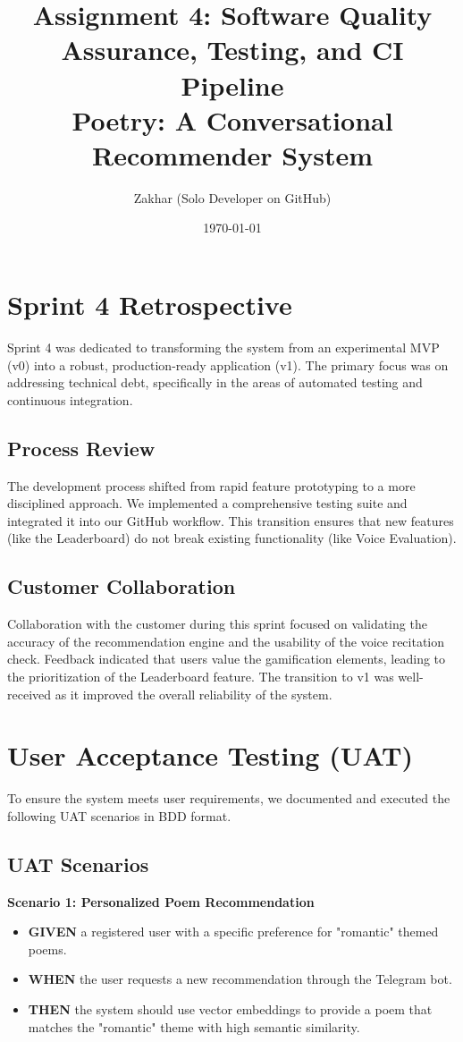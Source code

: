 \documentclass[12pt,a4paper]{article}
\title{Assignment 4: Software Quality Assurance, Testing, and CI Pipeline \\ \large Poetry: A Conversational Recommender System}
\author{Zakhar (Solo Developer on GitHub)}
\date{\today}
\begin{document}
\maketitle

\tableofcontents
\newpage

\section{Sprint 4 Retrospective}
Sprint 4 was dedicated to transforming the system from an experimental MVP (v0) into a robust, production-ready application (v1). The primary focus was on addressing technical debt, specifically in the areas of automated testing and continuous integration.

\subsection{Process Review}
The development process shifted from rapid feature prototyping to a more disciplined approach. We implemented a comprehensive testing suite and integrated it into our GitHub workflow. This transition ensures that new features (like the Leaderboard) do not break existing functionality (like Voice Evaluation).

\subsection{Customer Collaboration}
Collaboration with the customer during this sprint focused on validating the accuracy of the recommendation engine and the usability of the voice recitation check. Feedback indicated that users value the gamification elements, leading to the prioritization of the Leaderboard feature. The transition to v1 was well-received as it improved the overall reliability of the system.

\section{User Acceptance Testing (UAT)}
To ensure the system meets user requirements, we documented and executed the following UAT scenarios in BDD format.

\subsection{UAT Scenarios}

\textbf{Scenario 1: Personalized Poem Recommendation}
\begin{itemize}
    \item \textbf{GIVEN} a registered user with a specific preference for "romantic" themed poems.
    \item \textbf{WHEN} the user requests a new recommendation through the Telegram bot.
    \item \textbf{THEN} the system should use vector embeddings to provide a poem that matches the "romantic" theme with high semantic similarity.
\end{itemize}
\end{document}
